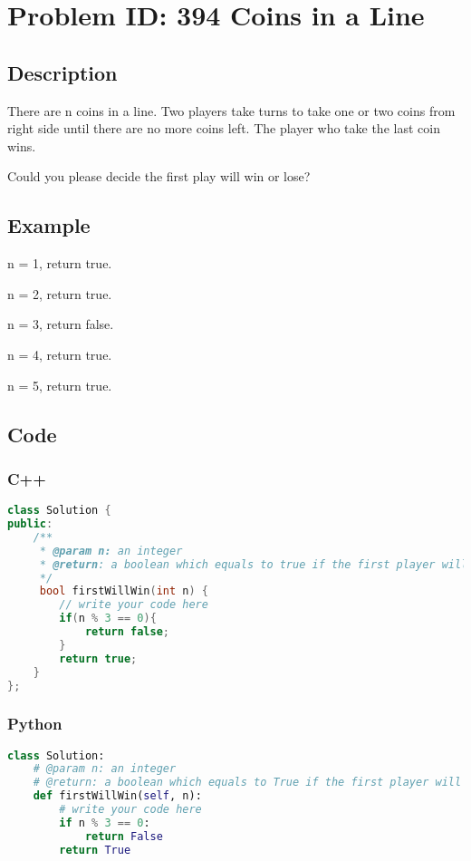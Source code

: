 \section{Problem ID: 394 Coins in a Line}
\subsection{Description}
There are n coins in a line. Two players take turns to take one or two coins from right side until there are no more coins left. The player who take the last coin wins.

Could you please decide the first play will win or lose?

\subsection{Example}
n = 1, return true.

n = 2, return true.

n = 3, return false.

n = 4, return true.

n = 5, return true.

\subsection{Code}
\scriptsize
\subsubsection{C++}
\begin{lstlisting}[language=C++]
class Solution {
public:
    /**
     * @param n: an integer
     * @return: a boolean which equals to true if the first player will win
     */
     bool firstWillWin(int n) {
        // write your code here
        if(n % 3 == 0){
            return false;
        }
        return true;
    }
};
\end{lstlisting}

\subsubsection{Python}
\begin{lstlisting}[language=Python]
class Solution:
    # @param n: an integer
    # @return: a boolean which equals to True if the first player will win
    def firstWillWin(self, n):
        # write your code here
        if n % 3 == 0:
            return False
        return True
\end{lstlisting}
\normalsize 